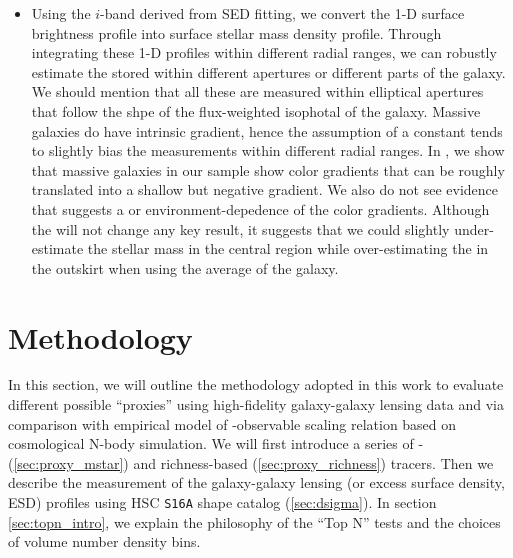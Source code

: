 \documentclass[a4paper,fleqn,usenatbib]{mnras}
\begin{document}
\begin{itemize}
		\item Using the $i$-band \mlratio{} derived from SED fitting, we convert the 
			1-D surface brightness profile into surface stellar mass density profile.
            Through integrating these 1-D profiles within different radial ranges, we 
            can robustly estimate the \mstar{} stored within different apertures or 
            different parts of the galaxy.
            We should mention that all these \mstar{} are measured within elliptical 
            apertures that follow the shpe of the flux-weighted isophotal of the galaxy.
            Massive galaxies do have intrinsic \mlratio{} gradient, hence the assumption of 
            a constant \mlratio{} tends to slightly bias the \mstar{} measurements within 
            different radial ranges.
            In \citet{Huang2018b}, we show that massive galaxies in our sample show
            color gradients that can be roughly translated into a shallow but negative 
            \mlratio{} gradient. 
            We also do not see evidence that suggests a \mstar{} or environment-depedence 
            of the color gradients.
            Although the \mlratio{} will not change any key result, it suggests that we
            could slightly under-estimate the stellar mass in the central region while
            over-estimating the \mstar{} in the outskirt when using the average \mlratio{}
            of the galaxy.

	\end{itemize}


\section{Methodology}
    \label{sec:method}
    
    In this section, we will outline the methodology adopted in this work to evaluate different 
    possible \mvir{} ``proxies'' using high-fidelity galaxy-galaxy lensing data and via
    comparison with empirical model of \mvir{}-observable scaling relation based on cosmological 
    N-body simulation.
    We will first introduce a series of \mstar{}- (\ref{sec:proxy_mstar}) and richness-based 
    (\ref{sec:proxy_richness}) \mvir{} tracers.
    Then we describe the measurement of the galaxy-galaxy lensing \dsigma{} (or excess surface 
    density, ESD) profiles using HSC \texttt{S16A} shape catalog (\ref{sec:dsigma}).
    In section \ref{sec:topn_intro}, we explain the philosophy of the ``Top N'' tests and the 
    choices of volume number density bins.
\end{document}
